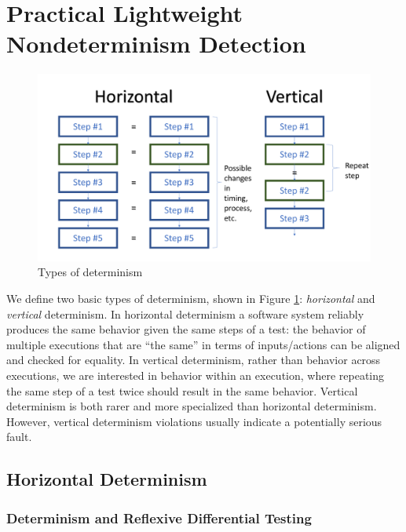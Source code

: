 \section{Practical Lightweight Nondeterminism
  Detection}

\begin{figure}
\includegraphics[width=\columnwidth]{types}
\caption{Types of determinism}
\label{fig:types}
\end{figure}

We define two basic types of determinism, shown in Figure
\ref{fig:types}:  \emph{horizontal} and \emph{vertical} determinism.  In
horizontal determinism a software system reliably
produces the same behavior given the same steps of a test: the
behavior of multiple executions that are ``the same'' in terms of
inputs/actions can be aligned and checked for equality.  In
vertical determinism, rather than behavior across executions, we are
interested in behavior within an execution, where repeating the same
step of a test twice should result in the same behavior.  Vertical determinism is both rarer and more specialized than
horizontal determinism.  However, vertical
determinism violations usually indicate a potentially serious fault.

\subsection{Horizontal Determinism}


\subsubsection{Determinism and Reflexive Differential Testing}

